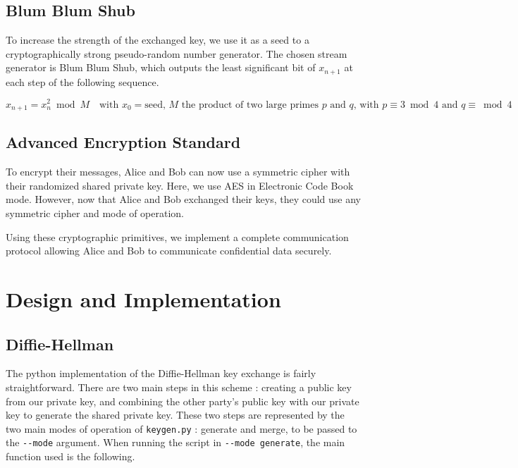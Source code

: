 \documentclass{article}
\begin{document}
\subsection{Blum Blum Shub}

To increase the strength of the exchanged key, we use it as a seed to a cryptographically strong pseudo-random number generator. The chosen stream generator is Blum Blum Shub\cite{Blum1986}, which outputs the least significant bit of $x_{{n+1}}$ at each step of the following sequence.

\begin{equation*}
    x_{n+1}=x_{n}^{2} \bmod M
    \quad \text{with $x_{0} = \text{seed}$, $M$ the product of two large primes $p$ and $q$, with $p \equiv 3 \bmod 4$ and $q \equiv \bmod 4$}
\end{equation*}

\subsection{Advanced Encryption Standard}

To encrypt their messages, Alice and Bob can now use a symmetric cipher with their randomized shared private key. Here, we use AES in Electronic Code Book mode. However, now that Alice and Bob exchanged their keys, they could use any symmetric cipher and mode of operation. 

Using these cryptographic primitives, we implement a complete communication protocol allowing Alice and Bob to communicate confidential data securely.

\section{Design and Implementation}

\subsection{Diffie-Hellman}

The python implementation of the Diffie-Hellman key exchange is fairly straightforward. There are two main steps in this scheme : creating a public key from our private key, and combining the other party's public key with our private key to generate the shared private key. These two steps are represented by the two main modes of operation of \verb+keygen.py+ : generate and merge, to be passed to the \verb+--mode+ argument. When running the script in \verb+--mode generate+, the main function used is the following.
\end{document}
